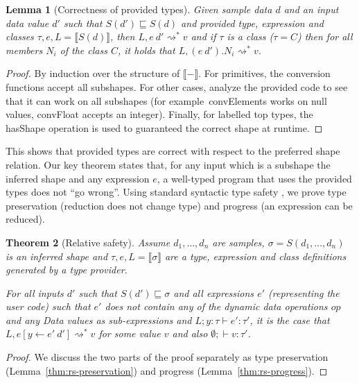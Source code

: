 \documentclass[pldi-cameraready]{sigplanconf-pldi16}
\newcommand{\kvd}[1]{\textnormal{\textcolor{kvdclr}{\sffamily #1}}}
\newcommand{\ident}[1]{\textnormal{\sffamily #1}}
\newcommand{\reduce}{\rightsquigarrow}
\newcommand{\sem}[1]{\llbracket #1 \rrbracket}
\newcommand{\semalt}[1]{S(#1)}
\newtheorem{theorem}{Theorem}
\newtheorem{lemma}[theorem]{Lemma}
\begin{document}
\begin{lemma}[Correctness of provided types]
\label{thm:tp-correctness}
Given sample data $d$ and an input data value $d'$ such that $\semalt{d'} \sqsubseteq \semalt{d}$
and provided type, expression and classes $\tau, e, L = \sem{\semalt{d}}$,
then $L, e~d' \reduce^{*} v$ and if $\tau$ is a class ($\tau=C$) then for all members $N_i$ of the
class $C$, it holds that $L, (e~d').N_i \reduce^{*} v$.
\end{lemma}
\begin{proof}
By induction over the structure of $\sem{-}$. For primitives, the conversion functions accept all subshapes.
For other cases, analyze the provided code to see that it can work on all subshapes (for example~\ident{convElements}
works on \kvd{null} values, \ident{convFloat} accepts an integer). Finally, for labelled top types,
the \ident{hasShape} operation is used to guaranteed the correct shape at runtime.
\end{proof}

\noindent
This shows that provided types are correct with respect to the preferred shape relation.
Our key theorem states that, for any input which is a subshape the inferred shape and
any expression $e$, a well-typed program that uses the provided types does not ``go wrong''.
Using standard syntactic type safety  \cite{syntactic}, we prove type preservation
(reduction does not change type) and progress (an expression can be reduced).

\begin{theorem}[Relative safety]
\label{thm:safety}
Assume $d_1, \ldots, d_n$ are samples, $\sigma=\semalt{d_1, \ldots, d_n}$ is an inferred
shape and $\tau,e,L = \sem{\sigma}$ are a type, expression and class definitions generated by a
type provider.

For all inputs $d'$ such that $\semalt{d'} \sqsubseteq \sigma$ and all expressions $e'$
(representing the user code) such that $e'$ does not contain any of the dynamic data operations $op$
and any \ident{Data} values as sub-expressions and $L; y\!:\!\tau \vdash e'\!:\!\tau'$, it is
the case that $L, e[y\leftarrow e'~d'] \reduce^{*} v$ for some value $v$ and
also $\emptyset; \vdash v : \tau'$.
\end{theorem}
\begin{proof}
We discuss the two parts of the proof separately as type preservation (Lemma~\ref{thm:rs-preservation})
and progress (Lemma~\ref{thm:rs-progress}).
\end{proof}
\end{document}
